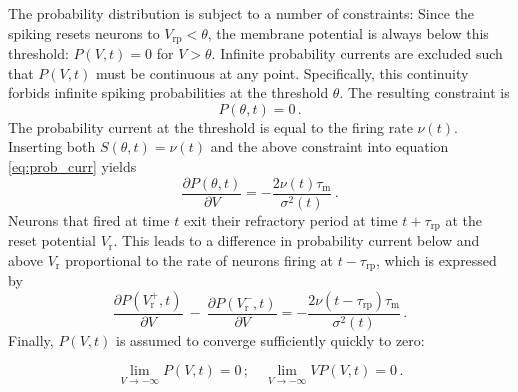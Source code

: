 The probability distribution is subject to a number of 
constraints: Since the spiking resets neurons to $V_\text{rp} < \theta$, 
the membrane potential is always below this threshold:
$P(V, t) = 0$ for $V > \theta$. Infinite probability currents are excluded 
such that $P(V, t)$ must be continuous at any point. Specifically, 
this continuity forbids infinite spiking probabilities at the threshold $\theta$. 
The resulting constraint is 
\begin{equation}
    P(\theta, t) = 0 \,.
    \label{eq:continuity} 
\end{equation}
The probability current at the threshold is equal to the firing rate
$\nu(t)$. Inserting both $S(\theta, t) = \nu(t)$ and the above constraint into 
equation \eqref{eq:prob_curr} yields
\begin{equation}
    \frac{\partial P(\theta, t)}{\partial V}    
        = - \frac{2 \nu(t) \tau_\text{m}}{\sigma^2(t)}  \,.
\end{equation}
Neurons that fired at time $t$ exit their refractory period at 
time $t + \tau_\text{rp}$ at the reset potential $V_\text{r}$. This leads to
a difference in probability current below and above $V_\text{r}$ proportional to 
the rate of neurons firing at $t - \tau_\text{rp}$, which is expressed by
\begin{equation}
    \frac{\partial P(V_\text{r}^+, t)}{\partial V} \: -  \: \frac{\partial P(V_\text{r}^-, t)}{\partial V} 
        = - \frac{2 \nu(t - \tau_\text{rp}) \tau_\text{m}}{\sigma^2(t)} \,.
\end{equation}
Finally, $P(V, t)$ is assumed to converge sufficiently quickly to zero:

\begin{equation}
\lim_{V \to -\infty} P(V, t) = 0 \, ;
    \quad 
    \lim_{V \to -\infty} V P(V, t) = 0 \,.
\end{equation}

